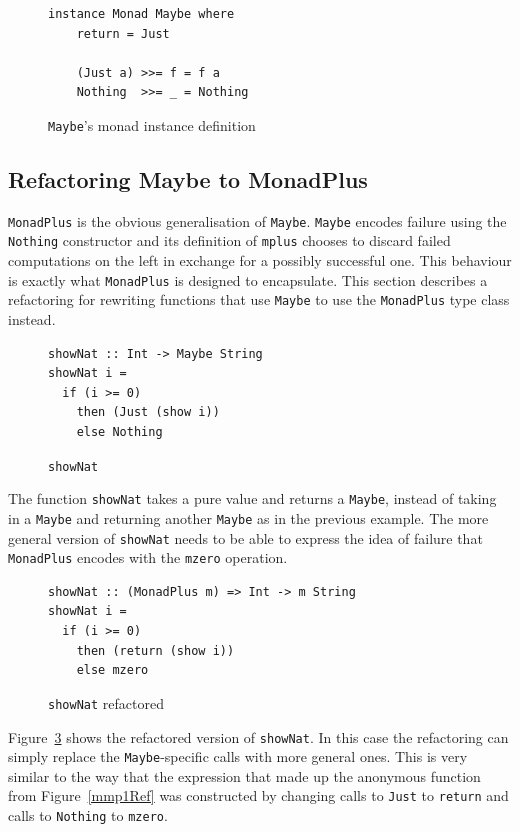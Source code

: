 \begin{figure}[t]
\begin{lstlisting}   
instance Monad Maybe where
	return = Just
	
	(Just a) >>= f = f a
	Nothing  >>= _ = Nothing
\end{lstlisting}
\caption{\texttt{Maybe}'s monad instance definition}
\label{maybeMonad}
\end{figure}


\subsection{Refactoring Maybe to MonadPlus} 

\texttt{MonadPlus} is the obvious generalisation of \texttt{Maybe}. \texttt{Maybe} encodes failure using the \texttt{Nothing} constructor and its definition of \texttt{mplus} chooses to discard failed computations on the left in exchange for a possibly successful one. This behaviour is exactly what \texttt{MonadPlus} is designed to encapsulate. This section describes a refactoring for rewriting functions that use \texttt{Maybe} to use the \texttt{MonadPlus} type class instead.

\begin{figure}[t]
\begin{lstlisting}
showNat :: Int -> Maybe String
showNat i =
  if (i >= 0)
    then (Just (show i))
    else Nothing
\end{lstlisting}
\caption{\texttt{showNat}}
\label{mmp2}
\end{figure}

The function \texttt{showNat} takes a pure value and returns a \texttt{Maybe}, instead of taking in a \texttt{Maybe} and returning another \texttt{Maybe} as in the previous example. The more general version of \texttt{showNat} needs to be able to express the idea of failure that \texttt{MonadPlus} encodes with the \texttt{mzero} operation. 

\begin{figure}[t]
\begin{lstlisting}
showNat :: (MonadPlus m) => Int -> m String
showNat i =
  if (i >= 0)
    then (return (show i))
    else mzero
\end{lstlisting}
\caption{\texttt{showNat} refactored}
\label{mmp2Ref}
\end{figure} 
 
Figure~\ref{mmp2Ref} shows the refactored version of \texttt{showNat}. In this case the refactoring can simply replace the \texttt{Maybe}-specific calls with more general ones. This is very similar to the way that the expression that made up the anonymous function from Figure~\ref{mmp1Ref} was constructed by changing calls to \texttt{Just} to \texttt{return} and calls to \texttt{Nothing} to \texttt{mzero}. 

